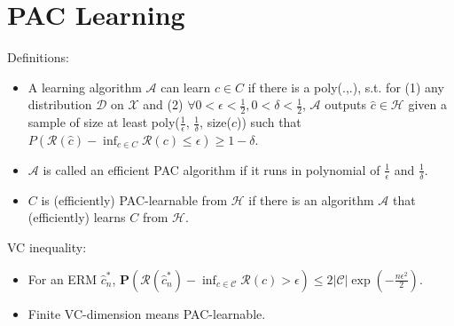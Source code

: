 \section{PAC Learning}

Definitions:
\begin{itemize}
    \item A learning algorithm $\mathcal{A}$ can learn $c\in C$ if there is a poly(.,.), s.t. for (1) any distribution $\mathcal{D}$ on $\mathcal{X}$ and (2) $\forall 0<\epsilon<\frac{1}{2},0<\delta<\frac{1}{2}$, $\mathcal{A}$ outputs $\hat{c}\in \mathcal{H}$ given a sample of size at least poly($\frac{1}{\epsilon}$, $\frac{1}{\delta}$, size($c$)) such that $P(\mathcal{R}(\hat{c})-\inf_{c\in C}\mathcal{R}(c)\le\epsilon) \ge 1-\delta$.
    \item $\mathcal{A}$ is called an efficient PAC algorithm if it runs in polynomial of $\frac{1}{\epsilon}$ and $\frac{1}{\delta}$.
    \item $C$ is (efficiently) PAC-learnable from $\mathcal{H}$ if there is an algorithm $\mathcal{A}$ that (efficiently) learns $C$ from $\mathcal{H}$.
\end{itemize}

VC inequality:
\begin{itemize}
    \item For an ERM $\hat{c}^*_n$, $\mathbf{P}\left(\mathcal{R}\left(\hat{c}_{n}^{*}\right)-\inf _{c \in \mathcal{C}} \mathcal{R}(c)>\epsilon\right) \leq 2|\mathcal{C}| \exp \left(-\frac{n \epsilon^{2}}{2}\right)$.
    \item Finite VC-dimension means PAC-learnable.
\end{itemize}